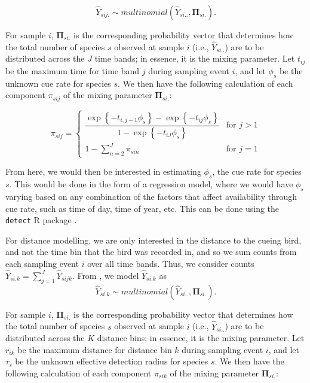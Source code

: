 $$\hat{Y}_{sij.} \sim multinomial\left(\hat{Y}_{si..}, \mathbf{\Pi}_{si.}\right).$$

\par For sample $i$, $\mathbf{\Pi}_{si.}$ is the corresponding probability vector that determines how the total number of species $s$ observed at sample $i$ (i.e., $\hat{Y}_{si..}$) are to be distributed across the $J$ time bands; in essence, it is the mixing parameter.
Let $t_{ij}$ be the maximum time for time band $j$ during sampling event $i$, and let $\phi_s$ be the unknown cue rate for species $s$.
We then have the following calculation of each component $\pi_{sij}$ of the mixing parameter $\mathbf{\Pi}_{si.}$:

\begin{equation*}
	\pi_{sij} = 
	\begin{cases}
		\dfrac{\exp\left\{ -t_{i,j-1}\phi_{s} \right\} - \exp\left\{ -t_{ij}\phi_{s} \right\}}{1 - \exp\left\{ -t_{iJ}\phi_{s} \right\}} & \text{for } j > 1 \\
		1 - \sum_{n = 2}^{J} \pi_{sin} & \text{for } j = 1
	\end{cases}
\end{equation*}

\par From here, we would then be interested in estimating $\phi_s$, the cue rate for species $s$.
This would be done in the form of a regression model, where we would have $\phi_s$ varying based on any combination of the factors that affect availability through cue rate, such as time of day, time of year, etc.
This can be done using the \texttt{detect} R package \citep{solymos_detect_2020}.

\par For distance modelling, we are only interested in the distance to the cueing bird, and not the time bin that the bird was recorded in, and so we sum counts from each sampling event $i$ over all time bands. 
Thus, we consider counts $\hat{Y}_{si.k} = \sum_{j=1}^{J}\hat{Y}_{sijk}$. 
From \citet{solymos_calibrating_2013}, we model $\hat{Y}_{si.k}$ as
$$\hat{Y}_{si.k} \sim multinomial\left(\hat{Y}_{si..}, \mathbf{\Pi}_{si.}\right).$$

\par For sample $i$, $\mathbf{\Pi}_{si.}$ is the corresponding probability vector that determines how the total number of species $s$ observed at sample $i$ (i.e., $\hat{Y}_{si..}$) are to be distributed across the $K$ distance bins; in essence, it is the mixing parameter. 
Let $r_{ik}$ be the maximum distance for distance bin $k$ during sampling event $i$, and let $\tau_s$ be the unknown effective detection radius for species $s$. 
We then have the following calculation of each component $\pi_{sik}$ of the mixing parameter $\mathbf{\Pi}_{si.}$:


